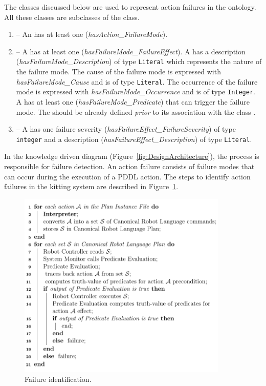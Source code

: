 The classes discussed below are used to represent action failures in the  ontology. All these classes are subclasses of the  class.
\begin{enumerate}
\item {} -- An  has at least one  (\emph{hasAction\_FailureMode}).
\item {} -- A  has at least one  (\emph{hasFailureMode\_FailureEffect}). A  has a description (\emph{hasFailureMode\_Description}) of type \texttt{Literal} which represents the nature of the failure mode. The cause of the failure mode is expressed with \emph{hasFailureMode\_Cause} and is of type \texttt{Literal}. The occurrence of the failure mode is expressed with \emph{hasFailureMode\_Occurrence} and is of type \texttt{Integer}. A  has at least one  (\emph{hasFailureMode\_Predicate}) that can trigger the failure mode. The  should be already defined \textit{prior} to its association with the class .
\item {} -- A  has one failure severity (\emph{hasFailureEffect\_FailureSeverity}) of type \texttt{integer} and a description (\emph{hasFailureEffect\_Description}) of type \texttt{Literal}.
\end{enumerate}

In the knowledge driven diagram (Figure~\ref{fig:DesignArchitecture}), the  process is responsible for failure detection. An action failure consists of failure modes that can occur during the execution of a PDDL action. The steps to identify action failures in the kitting system are described in Figure~\ref{fig:algo}.

\begin{figure}[h!t!]
  \centering
  \includegraphics[width=10cm]{images/algorithm.pdf}
  \caption{Failure identification.}
  \label{fig:algo}
\end{figure}

